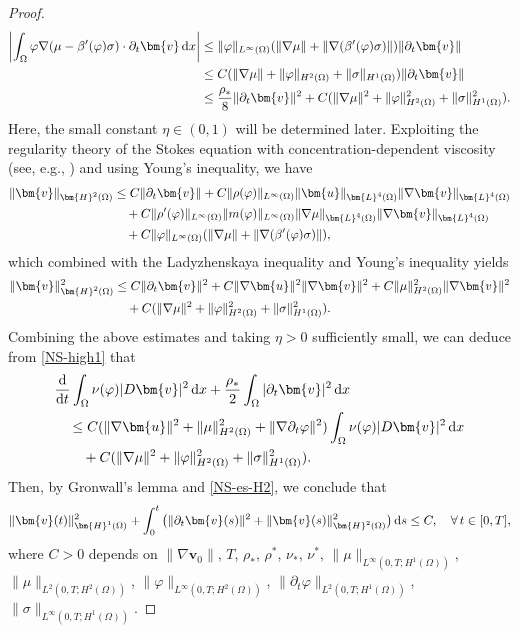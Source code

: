 \documentclass[11pt,reqno]{amsart}
\def\d{{\rm d}}
\def\H{\bm{H}}
\def\L{\bm{L}}
\def\uu{\bm{u}}
\def\vv{\bm{v}}
\begin{document}
\begin{proof}
\begin{align}
   \left| \int_\Omega \varphi \nabla (\mu -\beta'(\varphi) \sigma)\cdot \partial_t \vv\, \d x\right|
   &\leq \|\varphi\|_{L^\infty(\Omega)}(\|\nabla \mu\|+\|\nabla (\beta'(\varphi) \sigma)\|)\|\partial_t \vv\|
   \notag\\
   & \leq C(\|\nabla \mu\|+\|\varphi\|_{H^2(\Omega)} + \|\sigma\|_{H^1(\Omega)})\|\partial_t \vv\|
\notag\\
&\leq \frac{\rho_*}{8}\|\partial_t\vv\|^2  + C(\|\nabla \mu\|^2
+\|\varphi\|_{H^2(\Omega)}^2+ \|\sigma\|_{H^1(\Omega)}^2).
\notag
\end{align}
%
Here, the small constant $\eta\in (0,1)$ will be determined later.
Exploiting the regularity theory of the Stokes equation with concentration-dependent viscosity
(see, e.g., \cite[Lemma 4]{Abels2009}) and using Young's inequality, we have
%
\begin{align}
\|\vv\|_{\H^2(\Omega)}
&\leq C\|\partial_t\vv\|+ C \|\rho(\varphi)\|_{L^\infty(\Omega)}\|\uu\|_{\L^4(\Omega)}\|\nabla \vv\|_{\L^4(\Omega)}
\notag\\
&\quad + C\|\rho'(\varphi)\|_{L^\infty(\Omega)}\|m(\varphi)\|_{L^\infty(\Omega)}\|\nabla \mu\|_{\L^4(\Omega)}\|\nabla \vv\|_{\L^4(\Omega)}
\notag\\
&\quad + C\|\varphi\|_{L^\infty(\Omega)}(\|\nabla \mu\|+\|\nabla (\beta'(\varphi)\sigma)\|),
\notag
\end{align}
%
which combined with the Ladyzhenskaya inequality and  Young's inequality yields
%
\begin{align}
\|\vv\|_{\H^2(\Omega)}^2
&\leq C\|\partial_t\vv\|^2
+ C\|\nabla \uu\|^2\|\nabla \vv\|^2 + C \|\mu\|_{H^2(\Omega)}^2\|\nabla \vv\|^2
\notag \\
&\quad + C(\|\nabla \mu\|^2+\|\varphi\|_{H^2(\Omega)}^2+ \|\sigma\|_{H^1(\Omega)}^2).
\label{NS-es-H2}
\end{align}
%
Combining the above estimates and taking $\eta>0$ sufficiently small, we can deduce from
\eqref{NS-high1} that
%
\begin{align}
&\frac{\d}{\d t}\int_\Omega \nu(\varphi)|D\vv|^2\,\d x + \frac{\rho_*}{2}\int_\Omega |\partial_t \vv|^2\,\d x
\notag \\
&\quad  \leq  C(\|\nabla \uu\|^2+ \|\mu\|_{H^2(\Omega)}^2+ \|\nabla \partial_t\varphi\|^2)\int_\Omega \nu(\varphi)|D\vv|^2\,\d x
\notag \\
&\qquad + C(\|\nabla \mu\|^2+\|\varphi\|_{H^2(\Omega)}^2+ \|\sigma\|_{H^1(\Omega)}^2).
\label{NS-high2}
\end{align}
%
Then, by Gronwall's lemma and \eqref{NS-es-H2}, we conclude that
%
\begin{align}
\|\vv(t)\|_{\H^1(\Omega)}^2+\int_0^t \big(\|\partial_t\vv(s)\|^2+ \|\vv(s)\|^2_{\H^2(\Omega)}\big)\,\d s\leq C,\quad \forall\, t\in [0,T],
\label{NS-high3}
\end{align}
%
where $C>0$ depends on $\|\nabla \vv_0\|$, $T$, $\rho_*$, $\rho^*$, $\nu_*$, $\nu^*$, $\|\mu\|_{L^\infty(0,T;H^1(\Omega))}$,
$\|\mu\|_{L^2(0,T;H^2(\Omega))}$, $\|\varphi\|_{L^\infty(0,T;H^2(\Omega))}$,
$\|\partial_t \varphi\|_{L^2(0,T;H^1(\Omega))}$,
$\|\sigma\|_{L^\infty(0,T;H^1(\Omega))}$.


\end{proof}
\end{document}
